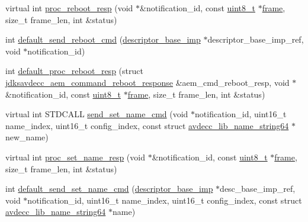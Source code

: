 \begin{DoxyCompactItemize}
\item 
virtual int \hyperlink{classavdecc__lib_1_1descriptor__base__imp_a8b3de398748e8299daf7296964f73c22}{proc\+\_\+reboot\+\_\+resp} (void $\ast$\&notification\+\_\+id, const \hyperlink{stdint_8h_aba7bc1797add20fe3efdf37ced1182c5}{uint8\+\_\+t} $\ast$\hyperlink{gst__avb__playbin_8c_ac8e710e0b5e994c0545d75d69868c6f0}{frame}, size\+\_\+t frame\+\_\+len, int \&status)
\item 
int \hyperlink{classavdecc__lib_1_1descriptor__base__imp_a14e3bd11c70e839a0594dc59dffcbf16}{default\+\_\+send\+\_\+reboot\+\_\+cmd} (\hyperlink{classavdecc__lib_1_1descriptor__base__imp}{descriptor\+\_\+base\+\_\+imp} $\ast$descriptor\+\_\+base\+\_\+imp\+\_\+ref, void $\ast$notification\+\_\+id)
\item 
int \hyperlink{classavdecc__lib_1_1descriptor__base__imp_a774dc940e9918a60127b0b021582b32a}{default\+\_\+proc\+\_\+reboot\+\_\+resp} (struct \hyperlink{structjdksavdecc__aem__command__reboot__response}{jdksavdecc\+\_\+aem\+\_\+command\+\_\+reboot\+\_\+response} \&aem\+\_\+cmd\+\_\+reboot\+\_\+resp, void $\ast$\&notification\+\_\+id, const \hyperlink{stdint_8h_aba7bc1797add20fe3efdf37ced1182c5}{uint8\+\_\+t} $\ast$\hyperlink{gst__avb__playbin_8c_ac8e710e0b5e994c0545d75d69868c6f0}{frame}, size\+\_\+t frame\+\_\+len, int \&status)
\item 
virtual int S\+T\+D\+C\+A\+LL \hyperlink{classavdecc__lib_1_1descriptor__base__imp_af0bb05af3bf67f2ab0eb522096011592}{send\+\_\+set\+\_\+name\+\_\+cmd} (void $\ast$notification\+\_\+id, uint16\+\_\+t name\+\_\+index, uint16\+\_\+t config\+\_\+index, const struct \hyperlink{structavdecc__lib_1_1avdecc__lib__name__string64}{avdecc\+\_\+lib\+\_\+name\+\_\+string64} $\ast$new\+\_\+name)
\item 
virtual int \hyperlink{classavdecc__lib_1_1descriptor__base__imp_a182c43d9f31980bb74f05956b1323624}{proc\+\_\+set\+\_\+name\+\_\+resp} (void $\ast$\&notification\+\_\+id, const \hyperlink{stdint_8h_aba7bc1797add20fe3efdf37ced1182c5}{uint8\+\_\+t} $\ast$\hyperlink{gst__avb__playbin_8c_ac8e710e0b5e994c0545d75d69868c6f0}{frame}, size\+\_\+t frame\+\_\+len, int \&status)
\item 
int \hyperlink{classavdecc__lib_1_1descriptor__base__imp_aed899a0eaaaa06a02569135f844ffce8}{default\+\_\+send\+\_\+set\+\_\+name\+\_\+cmd} (\hyperlink{classavdecc__lib_1_1descriptor__base__imp}{descriptor\+\_\+base\+\_\+imp} $\ast$desc\+\_\+base\+\_\+imp\+\_\+ref, void $\ast$notification\+\_\+id, uint16\+\_\+t name\+\_\+index, uint16\+\_\+t config\+\_\+index, const struct \hyperlink{structavdecc__lib_1_1avdecc__lib__name__string64}{avdecc\+\_\+lib\+\_\+name\+\_\+string64} $\ast$name)

\end{DoxyCompactItemize}
